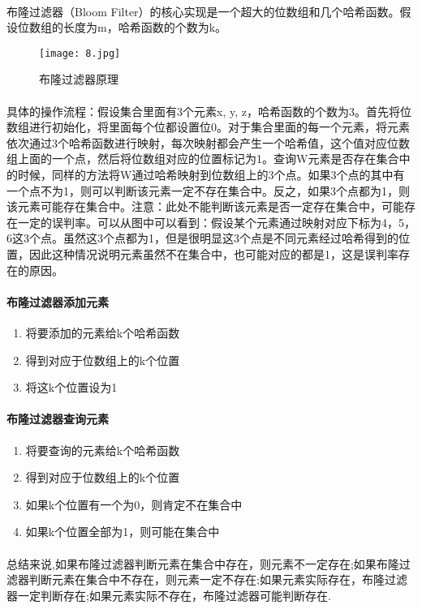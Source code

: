 \documentclass[lang=cn,11pt,a4paper,cite=numbers]{elegantpaper}
\begin{document}
\paragraph{}布隆过滤器（Bloom Filter）的核心实现是一个超大的位数组和几个哈希函数。假设位数组的长度为m，哈希函数的个数为k。
\begin{figure}[!htb]
    \centering
    \texttt{[image: 8.jpg]}
    \caption{布隆过滤器原理}
\end{figure}
\paragraph{}具体的操作流程：假设集合里面有3个元素{x, y, z}，哈希函数的个数为3。首先将位数组进行初始化，将里面每个位都设置位0。对于集合里面的每一个元素，将元素依次通过3个哈希函数进行映射，每次映射都会产生一个哈希值，这个值对应位数组上面的一个点，然后将位数组对应的位置标记为1。查询W元素是否存在集合中的时候，同样的方法将W通过哈希映射到位数组上的3个点。如果3个点的其中有一个点不为1，则可以判断该元素一定不存在集合中。反之，如果3个点都为1，则该元素可能存在集合中。注意：此处不能判断该元素是否一定存在集合中，可能存在一定的误判率。可以从图中可以看到：假设某个元素通过映射对应下标为4，5，6这3个点。虽然这3个点都为1，但是很明显这3个点是不同元素经过哈希得到的位置，因此这种情况说明元素虽然不在集合中，也可能对应的都是1，这是误判率存在的原因。
\paragraph{布隆过滤器添加元素}
\begin{enumerate}
    \item 将要添加的元素给k个哈希函数
    \item 得到对应于位数组上的k个位置
    \item 将这k个位置设为1
\end{enumerate}
\paragraph{布隆过滤器查询元素}
\begin{enumerate}
    \item 将要查询的元素给k个哈希函数
    \item 得到对应于位数组上的k个位置
    \item 如果k个位置有一个为0，则肯定不在集合中
    \item 如果k个位置全部为1，则可能在集合中
\end{enumerate}
\paragraph{}总结来说,如果布隆过滤器判断元素在集合中存在，则元素不一定存在;如果布隆过滤器判断元素在集合中不存在，则元素一定不存在;如果元素实际存在，布隆过滤器一定判断存在;如果元素实际不存在，布隆过滤器可能判断存在.
\end{document}
